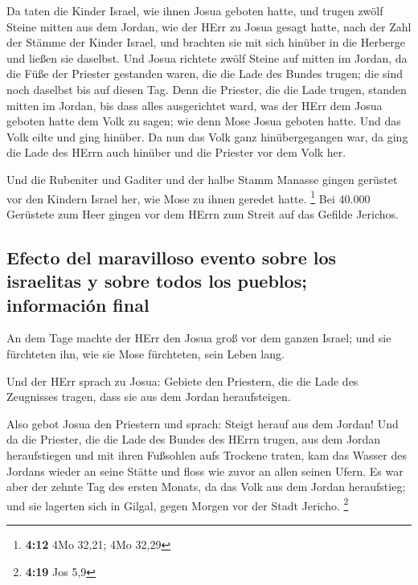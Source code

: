  Da taten die Kinder Israel, wie ihnen Josua geboten
hatte, und trugen zwölf Steine mitten aus dem Jordan, wie der HErr zu
Josua gesagt hatte, nach der Zahl der Stämme der Kinder Israel, und
brachten sie mit sich hinüber in die Herberge und ließen sie daselbst.
 Und Josua richtete zwölf Steine auf mitten im Jordan, da
die Füße der Priester gestanden waren, die die Lade des Bundes trugen;
die sind noch daselbst bis auf diesen Tag.  Denn die
Priester, die die Lade trugen, standen mitten im Jordan, bis dass alles
ausgerichtet ward, was der HErr dem Josua geboten hatte dem Volk zu
sagen; wie denn Mose Josua geboten hatte. Und das Volk eilte und ging
hinüber.  Da nun das Volk ganz hinübergegangen war, da
ging die Lade des HErrn auch hinüber und die Priester vor dem Volk her.

 Und die Rubeniter und Gaditer und der halbe Stamm
Manasse gingen gerüstet vor den Kindern Israel her, wie Mose zu ihnen
geredet hatte. \footnote{\textbf{4:12} 4Mo 32,21; 4Mo 32,29}
 Bei 40.000 Gerüstete zum Heer gingen vor dem HErrn zum
Streit auf das Gefilde Jerichos.

\hypertarget{efecto-del-maravilloso-evento-sobre-los-israelitas-y-sobre-todos-los-pueblos-informaciuxf3n-final}{%
\subsection{Efecto del maravilloso evento sobre los israelitas y sobre
todos los pueblos; información
final}\label{efecto-del-maravilloso-evento-sobre-los-israelitas-y-sobre-todos-los-pueblos-informaciuxf3n-final}}

 An dem Tage machte der HErr den Josua groß vor dem
ganzen Israel; und sie fürchteten ihn, wie sie Mose fürchteten, sein
Leben lang.

 Und der HErr sprach zu Josua:  Gebiete
den Priestern, die die Lade des Zeugnisses tragen, dass sie aus dem
Jordan heraufsteigen.

 Also gebot Josua den Priestern und sprach: Steigt herauf
aus dem Jordan!  Und da die Priester, die die Lade des
Bundes des HErrn trugen, aus dem Jordan heraufstiegen und mit ihren
Fußsohlen aufs Trockene traten, kam das Wasser des Jordans wieder an
seine Stätte und floss wie zuvor an allen seinen Ufern. 
Es war aber der zehnte Tag des ersten Monats, da das Volk aus dem Jordan
heraufstieg; und sie lagerten sich in Gilgal, gegen Morgen vor der Stadt
Jericho. \footnote{\textbf{4:19} Jos 5,9}

